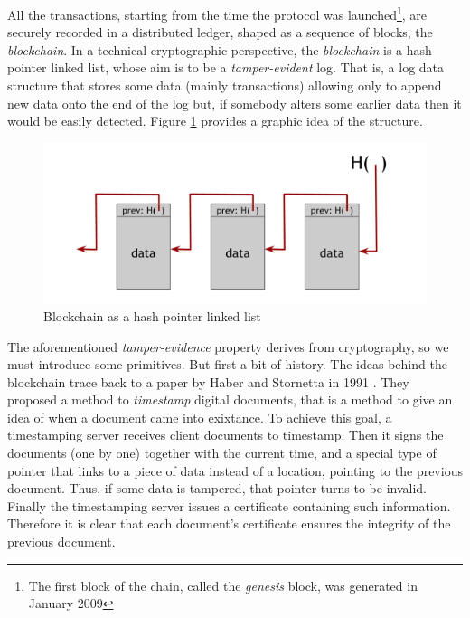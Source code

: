 \bigskip
\noindent
All the transactions, starting from the time the protocol was launched\footnote{The first block of the chain, called the \textit{genesis} block, was generated in January 2009}, are securely recorded in a distributed ledger, shaped as a sequence of blocks, the \textit{blockchain}. In a technical cryptographic perspective, the \textit{blockchain} is a hash pointer linked list, whose aim is to be a \textit{tamper-evident} log. That is, a log data structure that stores some data (mainly transactions) allowing only to append new data onto the end of the log but, if somebody alters some earlier data then it would be easily detected. Figure \ref{fig:blockchain} provides a graphic idea of the structure.

\begin{figure}[!htbp]
    \centering
    \includegraphics[width=0.9\linewidth]{Images/blockchain.png}
    \caption{Blockchain as a hash pointer linked list}
    \label{fig:blockchain}
\end{figure}

\newpage
\bigskip
\noindent
The aforementioned \textit{tamper-evidence} property derives from cryptography, so we must introduce some primitives. But first a bit of history. The ideas behind the blockchain trace back to a paper by Haber and Stornetta in 1991 \cite{Haber91howto}. They proposed a method to \textit{timestamp} digital documents, that is a method to give an idea of when a document came into exixtance. To achieve this goal, a timestamping server receives client documents to timestamp. Then it signs the documents (one by one) together with the current time, and a special type of pointer that links to a piece of data instead of a location, pointing to the previous document. Thus, if some data is tampered, that pointer turns to be invalid. Finally the timestamping server issues a certificate containing such information. Therefore it is clear that each document's certificate ensures the integrity of the previous document.

